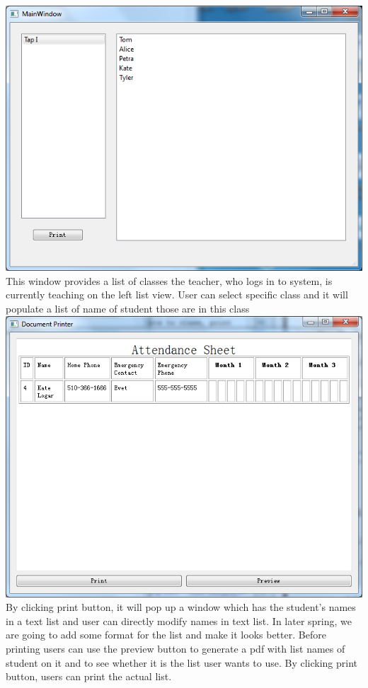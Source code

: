 \includegraphics[scale=0.5]{pics/role.png}\\
This window provides a list of classes the teacher, who logs in to system, is currently teaching on the left list view. User can select specific class and it will populate a list of name of student those are in this class\\
\includegraphics[scale=0.5]{pics/print.png}\\
By clicking print button, it will pop up a window which has the student's names in a text list and user can directly modify names in text list. In later spring, we are going to add some format for the list and make it looks better.  Before printing users can use the preview button to generate a pdf with list names of student on it and to see whether it is the list user wants to use. By clicking print button, users can print the actual list.

